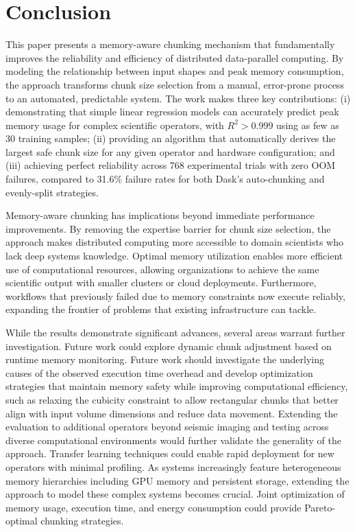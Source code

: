 \section{Conclusion}
\label{sec:conclusion}

This paper presents a memory-aware chunking mechanism that fundamentally improves the reliability and efficiency of distributed data-parallel computing.
By modeling the relationship between input shapes and peak memory consumption, the approach transforms chunk size selection from a manual, error-prone process to an automated, predictable system.
The work makes three key contributions: (i) demonstrating that simple linear regression models can accurately predict peak memory usage for complex scientific operators, with $R^2 > 0.999$ using as few as 30 training samples; (ii) providing an algorithm that automatically derives the largest safe chunk size for any given operator and hardware configuration; and (iii) achieving perfect reliability across 768 experimental trials with zero \ac{OOM} failures, compared to 31.6\% failure rates for both Dask's auto-chunking and evenly-split strategies.

Memory-aware chunking has implications beyond immediate performance improvements.
By removing the expertise barrier for chunk size selection, the approach makes distributed computing more accessible to domain scientists who lack deep systems knowledge.
Optimal memory utilization enables more efficient use of computational resources, allowing organizations to achieve the same scientific output with smaller clusters or cloud deployments.
Furthermore, workflows that previously failed due to memory constraints now execute reliably, expanding the frontier of problems that existing infrastructure can tackle.

While the results demonstrate significant advances, several areas warrant further investigation.
Future work could explore dynamic chunk adjustment based on runtime memory monitoring.
Future work should investigate the underlying causes of the observed execution time overhead and develop optimization strategies that maintain memory safety while improving computational efficiency, such as relaxing the cubicity constraint to allow rectangular chunks that better align with input volume dimensions and reduce data movement.
Extending the evaluation to additional operators beyond seismic imaging and testing across diverse computational environments would further validate the generality of the approach.
Transfer learning techniques could enable rapid deployment for new operators with minimal profiling.
As systems increasingly feature heterogeneous memory hierarchies including \ac{GPU} memory and persistent storage, extending the approach to model these complex systems becomes crucial.
Joint optimization of memory usage, execution time, and energy consumption could provide Pareto-optimal chunking strategies.

